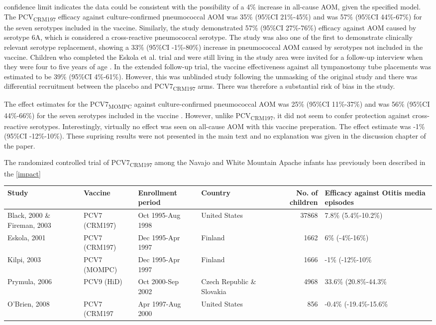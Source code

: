 \documentclass[]{book}
\theoremstyle{definition}
\theoremstyle{definition}
\theoremstyle{definition}
\theoremstyle{remark}
\begin{document}
confidence limit indicates the data could be consistent with the
possibility of a 4\% increase in all-cause AOM, given the specified
model. The PCV\textsubscript{CRM197} efficacy against culture-confirmed
pneumococcal AOM was 35\% (95\%CI 21\%-45\%) and was 57\% (95\%CI
44\%-67\%) for the seven serotypes included in the vaccine. Similarly,
the study demonstrated 57\% (95\%CI 27\%-76\%) efficacy against AOM
caused by serotype 6A, which is considered a cross-reactive pneumococcal
serotype. The study was also one of the first to demonstrate clinically
relevant serotype replacement, showing a 33\% (95\%CI -1\%-80\%)
increase in pneumococcal AOM caused by serotypes not included in the
vaccine. Children who completed the Eskola et al. trial and were still
living in the study area were invited for a follow-up interview when
they were four to five years of age \citep{Palmu2004}. In the extended
follow-up trial, the vaccine effectiveness against all tympanostomy tube
placements was estimated to be 39\% (95\%CI 4\%-61\%). However, this was
unblinded study following the unmasking of the original study and there
was differential recruitment between the placebo and
PCV7\textsubscript{CRM197} arms. There was therefore a substantial risk
of bias in the study.

The effect estimates for the PCV7\textsubscript{MOMPC} against
culture-confirmed pneumococcal AOM was 25\% (95\%CI 11\%-37\%) and was
56\% (95\%CI 44\%-66\%) for the seven serotypes included in the vaccine
\citep{Kilpi2003}. However, unlike PCV\textsubscript{CRM197}, it did not
seem to confer protection against cross-reactive serotypes.
Interestingly, virtually no effect was seen on all-cause AOM with this
vaccine preperation. The effect estimate was -1\% (95\%CI -12\%-10\%).
These suprising results were not presented in the main text and no
explanation was given in the discussion chapter of the paper.

The randomized controlled trial of PCV7\textsubscript{CRM197} among the
Navajo and White Mountain Apache infants has previously been described
in the \ref{impact}

\begin{tabular}{llllrl}
\toprule
Study & Vaccine & Enrollment period & Country & No. of children & Efficacy against Otitis media episodes\\
\midrule
Black, 2000 \& Fireman, 2003 & PCV7 (CRM197) & Oct 1995-Aug 1998 & United States & 37868 & 7.8\% (5.4\%-10.2\%)\\
Eskola, 2001 & PCV7 (CRM197) & Dec 1995-Apr 1997 & Finland & 1662 & 6\% (-4\%-16\%)\\
Kilpi, 2003 & PCV7 (MOMPC) & Dec 1995-Apr 1997 & Finland & 1666 & -1\% (-12\%-10\%\\
Prymula, 2006 & PCV9 (HiD) & Oct 2000-Sep 2002 & Czech Republic \& Slovakia & 4968 & 33.6\% (20.8\%-44.3\%\\
O'Brien, 2008 & PCV7 (CRM197 & Apr 1997-Aug 2000 & United States & 856 & -0.4\% (-19.4\%-15.6\%\\
\bottomrule
\end{tabular}
\end{document}
